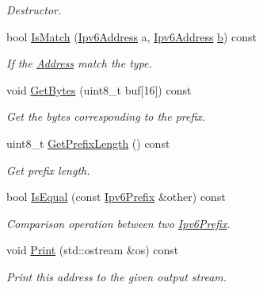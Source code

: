 \begin{DoxyCompactItemize}
\begin{DoxyCompactList}\small\item\em Destructor. \end{DoxyCompactList}\item 
bool \hyperlink{classns3_1_1Ipv6Prefix_a5f3b3a0cf052a6da31c4be0f15be53f2}{Is\+Match} (\hyperlink{classns3_1_1Ipv6Address}{Ipv6\+Address} a, \hyperlink{classns3_1_1Ipv6Address}{Ipv6\+Address} \hyperlink{lte__pathloss_8m_a21ad0bd836b90d08f4cf640b4c298e7c}{b}) const 
\begin{DoxyCompactList}\small\item\em If the \hyperlink{classns3_1_1Address}{Address} match the type. \end{DoxyCompactList}\item 
void \hyperlink{classns3_1_1Ipv6Prefix_aee4e14fef845e90b52cd506d41b7695a}{Get\+Bytes} (uint8\+\_\+t buf\mbox{[}16\mbox{]}) const 
\begin{DoxyCompactList}\small\item\em Get the bytes corresponding to the prefix. \end{DoxyCompactList}\item 
uint8\+\_\+t \hyperlink{classns3_1_1Ipv6Prefix_a716223a170c0127b3e5bed1b91166dcb}{Get\+Prefix\+Length} () const 
\begin{DoxyCompactList}\small\item\em Get prefix length. \end{DoxyCompactList}\item 
bool \hyperlink{classns3_1_1Ipv6Prefix_a622d52fe7314d6fe7f901bc18de73fd3}{Is\+Equal} (const \hyperlink{classns3_1_1Ipv6Prefix}{Ipv6\+Prefix} \&other) const 
\begin{DoxyCompactList}\small\item\em Comparison operation between two \hyperlink{classns3_1_1Ipv6Prefix}{Ipv6\+Prefix}. \end{DoxyCompactList}\item 
void \hyperlink{classns3_1_1Ipv6Prefix_a4b684ba6e6615dd65638a763767f4333}{Print} (std\+::ostream \&os) const 
\begin{DoxyCompactList}\small\item\em Print this address to the given output stream. \end{DoxyCompactList}\end{DoxyCompactItemize}
